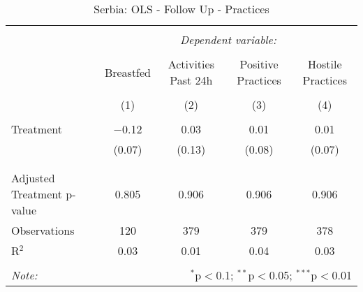 
\begin{table}[!htbp] \centering 
  \caption{Serbia: OLS - Follow Up - Practices} 
  \label{tbl:Serbia: OLS - Follow Up - Practices} 
\begin{tabular}{@{\extracolsep{5pt}}lcccc} 
\\[-1.8ex]\hline 
\hline \\[-1.8ex] 
 & \multicolumn{4}{c}{\textit{Dependent variable:}} \\ 
\cline{2-5} 
\\[-1.8ex] & Breastfed & Activities Past 24h & Positive Practices & Hostile Practices \\ 
\\[-1.8ex] & (1) & (2) & (3) & (4)\\ 
\hline \\[-1.8ex] 
 Treatment & $-$0.12 & 0.03 & 0.01 & 0.01 \\ 
  & (0.07) & (0.13) & (0.08) & (0.07) \\ 
  & & & & \\ 
\hline \\[-1.8ex] 
Adjusted Treatment p-value & 0.805 & 0.906 & 0.906 & 0.906 \\ 
Observations & 120 & 379 & 379 & 378 \\ 
R$^{2}$ & 0.03 & 0.01 & 0.04 & 0.03 \\ 
\hline 
\hline \\[-1.8ex] 
\textit{Note:}  & \multicolumn{4}{r}{$^{*}$p$<$0.1; $^{**}$p$<$0.05; $^{***}$p$<$0.01} \\ 
\end{tabular} 
\end{table} 
